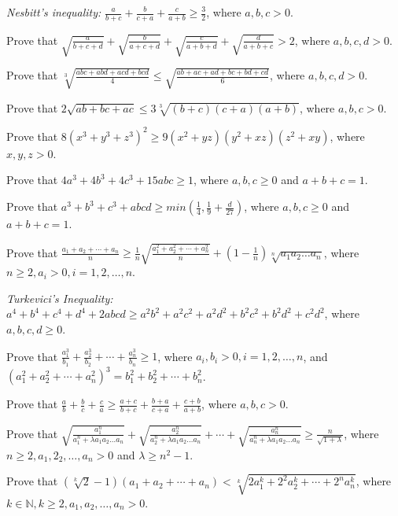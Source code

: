 \item {\it Nesbitt's inequality:} $\frac{a}{b + c} + \frac{b}{c + a} + \frac{c}{a + b}\geq \frac{3}{2}$, where $a, b, c > 0$.
\item Prove that $\sqrt{\frac{a}{b + c + d}} + \sqrt{\frac{b}{a + c + d}} + \sqrt{\frac{c}{a + b + d}} + \sqrt{\frac{d}{a + b + c}}
  > 2$, where $a, b, c, d > 0$.
\item Prove that $\sqrt[3]{\frac{abc + abd + acd + bcd}{4}}\leq \sqrt{\frac{ab + ac + ad + bc + bd + cd}{6}}$, where $a, b, c, d >
  0$.
\item Prove that $2\sqrt{ab + bc + ac}\leq 3\sqrt[3]{(b + c)(c + a)(a + b)}$, where $a, b, c > 0$.
\item Prove that $8(x^3 + y^3 + z^3)^2 \geq 9(x^2 + yz)(y^2 + xz)(z^2 + xy)$, where $x, y, z > 0$.
\item Prove that $4a^3 + 4b^3 + 4c^3 + 15abc\geq 1$, where $a, b, c\geq 0$ and $a + b + c = 1$.
\item Prove that $a^3 + b^3 + c^3 + abcd \geq min\left(\frac{1}{4}, \frac{1}{9} + \frac{d}{27}\right)$, where $a, b, c\geq 0$ and
  $a + b + c = 1$.
\item Prove that $\frac{a_1 + a_2 + \cdots + a_n}{n}\geq \frac{1}{n}\sqrt{\frac{a_1^2 + a_2^2 + \cdots + a_n^2}{n}} + \left(1 -
  \frac{1}{n}\right)\sqrt[n]{a_1a_2\ldots a_n}$, where $n\geq 2, a_i > 0, i = 1, 2, \ldots, n$.
\item {\it Turkevici's Inequality:} $a^4 + b^4 + c^4 + d^4 + 2abcd \geq a^2b^2 + a^2c^2 + a^2d^2 + b^2c^2 + b^2d^2 + c^2d^2$,
  where $a, b, c, d\geq 0$.
\item Prove that $\frac{a_1^3}{b_1} + \frac{a_2^3}{b_2} + \cdots + \frac{a_n^3}{b_n}\geq 1$, where $a_i, b_i > 0, i = 1, 2, \ldots,
  n$, and $(a_1^2 + a_2^2 + \cdots + a_n^2)^3 = b_1^2 + b_2^2 + \cdots + b_n^2$.
\item Prove that $\frac{a}{b} + \frac{b}{c} + \frac{c}{a}\geq \frac{a + c}{b + c} + \frac{b + a}{c + a} + \frac{c + b}{a + b}$,
  where $a, b, c > 0$.
\item Prove that $\sqrt{\frac{a_1^n}{a_1^n + \lambda a_1a_2\ldots a_n}} + \sqrt{\frac{a_2^n}{a_2^n + \lambda a_1a_2\ldots a_n}} +
  \cdots + \sqrt{\frac{a_n^n}{a_n^n + \lambda a_1a_2\ldots a_n}}\geq \frac{n}{\sqrt{1 + \lambda}}$, where $n\geq 2, a_1, 2_2,
  \ldots, a_n > 0$ and $\lambda \geq n^2 - 1$.
\item Prove that $\left(\sqrt[k]{2} - 1\right)(a_1 + a_2 + \cdots + a_n) < \sqrt[k]{2a_1^k + 2^2a_2^k + \cdots + 2^na_n^k}$, where
  $k\in\mathbb{N}, k\geq 2, a_1, a_2, \ldots, a_n > 0$.
